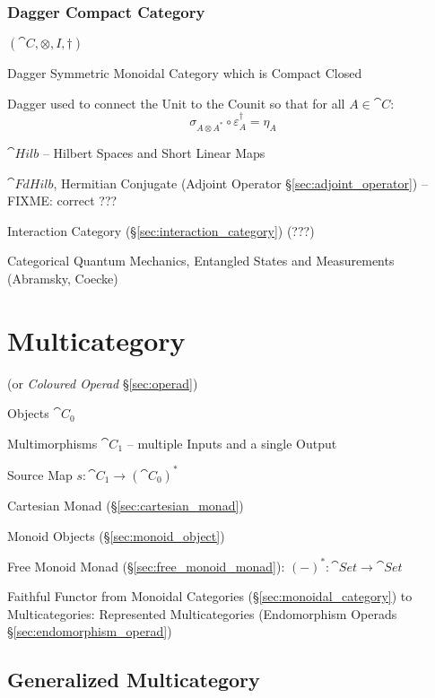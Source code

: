 \subsubsection{Dagger Compact Category}\label{sec:dagger_compact}

$(\cat{C}, \otimes, I, \dag)$

Dagger Symmetric Monoidal Category which is Compact Closed

Dagger used to connect the Unit to the Counit so that for all $A \in
\cat{C}$:
\[
  \sigma_{A \otimes A^*} \circ \varepsilon_A^\dag = \eta_A
\]

$\cat{Hilb}$ -- Hilbert Spaces and Short Linear Maps

$\cat{FdHilb}$, Hermitian Conjugate (Adjoint Operator
\S\ref{sec:adjoint_operator}) --FIXME: correct ???

Interaction Category (\S\ref{sec:interaction_category}) (???)

Categorical Quantum Mechanics, Entangled States and Measurements
(Abramsky, Coecke)



\section{Multicategory}\label{sec:multicategory}

(or \emph{Coloured Operad} \S\ref{sec:operad})

Objects $\cat{C}_0$

Multimorphisms $\cat{C}_1$ -- multiple Inputs and a single Output

Source Map $s : \cat{C}_1 \rightarrow (\cat{C}_0)^*$

Cartesian Monad (\S\ref{sec:cartesian_monad})

Monoid Objects (\S\ref{sec:monoid_object})

Free Monoid Monad (\S\ref{sec:free_monoid_monad}): $(-)^* : \cat{Set}
\rightarrow \cat{Set}$

Faithful Functor from Monoidal Categories
(\S\ref{sec:monoidal_category}) to Multicategories: Represented
Multicategories (Endomorphism Operads \S\ref{sec:endomorphism_operad})



\subsection{Generalized Multicategory}
\label{sec:generalized_multicategory}

